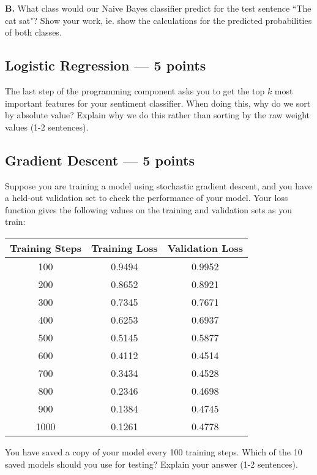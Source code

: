\documentclass[12pt,a4paper]{article}
\begin{document}
\vspace{\baselineskip}

\textbf{B.} What class would our Naive Bayes classifier predict for the test sentence ``The cat sat"? Show your work, ie. show the calculations for the predicted probabilities of both classes.


\subsection{Logistic Regression --- 5 points}

The last step of the programming component asks you to get the top $k$ most important features for your sentiment classifier. When doing this, why do we sort by absolute value? Explain why we do this rather than sorting by the raw weight values (1-2 sentences).

\subsection{Gradient Descent --- 5 points}

Suppose you are training a model using stochastic gradient descent, and you have a held-out validation set to check the performance of your model. Your loss function gives the following values on the training and validation sets as you train:
\begin{center}
\begin{tabular}{c c c}
\toprule
Training Steps & Training Loss & Validation Loss \\
\midrule
100 & 0.9494 & 0.9952 \\
200 & 0.8652 & 0.8921 \\
300 & 0.7345 & 0.7671 \\
400 & 0.6253 & 0.6937 \\
500 & 0.5145 & 0.5877 \\
600 & 0.4112 & 0.4514 \\
700 & 0.3434 & 0.4528 \\
800 & 0.2346 & 0.4698 \\
900 & 0.1384 & 0.4745 \\
1000 & 0.1261 & 0.4778 \\
\bottomrule
\end{tabular}
\end{center}

You have saved a copy of your model every 100 training steps. Which of the 10 saved models should you use for testing? Explain your answer (1-2 sentences).
\end{document}
